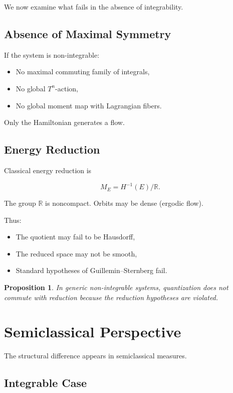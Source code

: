 \documentclass[11pt]{article}
\newtheorem{proposition}[theorem]{Proposition}
\begin{document}
We now examine what fails in the absence of integrability.

\subsection{Absence of Maximal Symmetry}

If the system is non-integrable:

\begin{itemize}
\item No maximal commuting family of integrals,
\item No global $T^n$-action,
\item No global moment map with Lagrangian fibers.
\end{itemize}

Only the Hamiltonian generates a flow.

\subsection{Energy Reduction}

Classical energy reduction is

\[
M_E = H^{-1}(E)/\mathbb{R}.
\]

The group $\mathbb{R}$ is noncompact.
Orbits may be dense (ergodic flow).

Thus:

\begin{itemize}
\item The quotient may fail to be Hausdorff,
\item The reduced space may not be smooth,
\item Standard hypotheses of Guillemin--Sternberg fail.
\end{itemize}

\begin{proposition}
In generic non-integrable systems, quantization does not commute with reduction because the reduction hypotheses are violated.
\end{proposition}

\section{Semiclassical Perspective}

The structural difference appears in semiclassical measures.

\subsection{Integrable Case}
\end{document}
